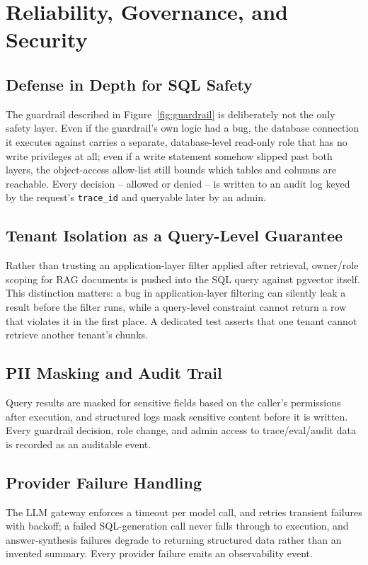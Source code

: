 \documentclass[conference]{IEEEtran}
\begin{document}
\section{Reliability, Governance, and Security}

\subsection{Defense in Depth for SQL Safety}
The guardrail described in Figure~\ref{fig:guardrail} is deliberately not
the only safety layer. Even if the guardrail's own logic had a bug, the
database connection it executes against carries a separate, database-level
read-only role that has no write privileges at all; even if a write
statement somehow slipped past both layers, the object-access allow-list
still bounds which tables and columns are reachable. Every decision --
allowed or denied -- is written to an audit log keyed by the request's
\texttt{trace\_id} and queryable later by an admin.

\subsection{Tenant Isolation as a Query-Level Guarantee}
Rather than trusting an application-layer filter applied after retrieval,
owner/role scoping for RAG documents is pushed into the SQL query against
pgvector itself. This distinction matters: a bug in application-layer
filtering can silently leak a result before the filter runs, while a
query-level constraint cannot return a row that violates it in the first
place. A dedicated test asserts that one tenant cannot retrieve another
tenant's chunks.

\subsection{PII Masking and Audit Trail}
Query results are masked for sensitive fields based on the caller's
permissions after execution, and structured logs mask sensitive content
before it is written. Every guardrail decision, role change, and admin
access to trace/eval/audit data is recorded as an auditable event.

\subsection{Provider Failure Handling}
The LLM gateway enforces a timeout per model call, and retries transient
failures with backoff; a failed SQL-generation call never falls through
to execution, and answer-synthesis failures degrade to returning
structured data rather than an invented summary. Every provider failure
emits an observability event.
\end{document}
